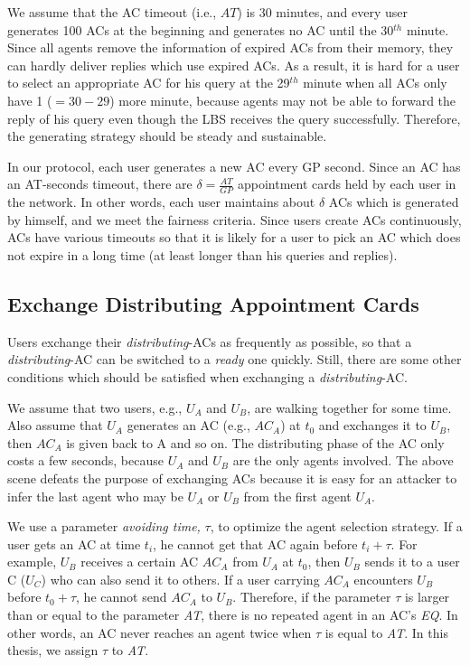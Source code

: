 We assume that the AC timeout (i.e., $AT$) is 30 minutes, and every user generates 100 ACs at the beginning and generates no AC until the 30${}^{th}$ minute. Since all agents remove the information of expired ACs from their memory, they can hardly deliver replies which use expired ACs. As a result, it is hard for a user to select an appropriate AC for his query at the 29${}^{th}$ minute when all ACs only have 1 ($=30-29$) more minute, because agents may not be able to forward the reply of his query even though the LBS receives the query successfully. Therefore, the generating strategy should be steady and sustainable.

In our protocol, each user generates a new AC every GP second. Since an AC has an AT-seconds timeout, there are $\delta =\frac{AT}{GP}$ appointment cards held by each user in the network. In other words, each user maintains about $\delta$ ACs which is generated by himself, and we meet the fairness criteria. Since users create ACs continuously, ACs have various timeouts so that it is likely for a user to pick an AC which does not expire in a long time (at least longer than his queries and replies).


\subsection{ Exchange Distributing Appointment Cards}\label{subsec_ExchangeDisAptCrd}

\noindent Users exchange their \textit{distributing}-ACs as frequently as possible, so that a \textit{distributing}-AC can be switched to a \textit{ready} one quickly. Still, there are some other conditions which should be satisfied when exchanging a \textit{distributing}-AC.

We assume that two users, e.g., $U_A$ and $U_B$, are walking together for some time. Also assume that $U_A$ generates an AC (e.g., ${AC}_A$) at $t_0$ and exchanges it to $U_B$, then ${AC}_A$ is given back to A and so on. The distributing phase of the AC only costs a few seconds, because $U_A$ and $U_B$ are the only agents involved. The above scene defeats the purpose of exchanging ACs because it is easy for an attacker to infer the last agent who may be $U_A$ or $U_B$ from the first agent $U_A$. 

We use a parameter \textit{avoiding time,} $\tau$, to optimize the agent selection strategy. If a user gets an AC at time $t_i$, he cannot get that AC again before $t_i+\tau $. For example, $U_B$ receives a certain AC ${AC}_A$ from $U_A$ at $t_0$, then $U_B$ sends it to a user C ($U_C$) who can also send it to others. If a user carrying ${AC}_A$ encounters $U_B$  before $t_0+\tau $, he cannot send ${AC}_A$ to $U_B$. Therefore, if the parameter $\tau $ is larger than or equal to the parameter \textit{AT}, there is no repeated agent in an AC's \textit{EQ}. In other words, an AC never reaches an agent twice when $\tau $ is equal to \textit{AT}. In this thesis, we assign $\tau $ to \textit{AT}. 

